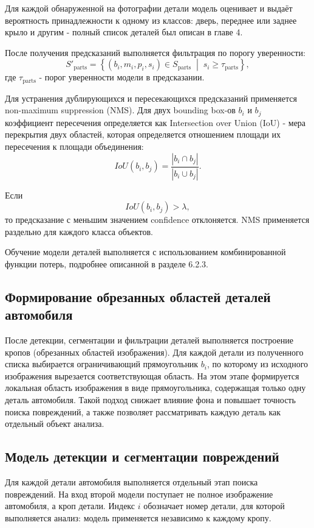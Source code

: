Для каждой обнаруженной на фотографии детали модель оценивает и выдаёт вероятность принадлежности к одному из классов: дверь, переднее или заднее крыло и другим - полный список деталей был описан в главе 4. 


После получения предсказаний выполняется фильтрация по порогу уверенности:
\[
S'_{\text{parts}} =
\left\{
(b_i, m_i, p_i, s_i) \in S_{\text{parts}} \;\middle|\;
s_i \geq \tau_{\text{parts}}
\right\},
\]
где $\tau_{\text{parts}}$ - порог уверенности модели в предсказании.

Для устранения дублирующихся и пересекающихся предсказаний применяется non-maximum suppression (NMS). Для двух bounding box-ов $b_i$ и $b_j$ коэффициент пересечения определяется как Intersection over Union (IoU) - мера перекрытия двух областей, которая определяется отношением площади их пересечения к площади объединения:
\[
IoU(b_i, b_j) = \frac{|b_i \cap b_j|}{|b_i \cup b_j|}.
\]

Если
\[
IoU(b_i, b_j) > \lambda,
\]
то предсказание с меньшим значением confidence отклоняется. NMS применяется раздельно для каждого класса объектов.

Обучение модели деталей выполняется с использованием комбинированной функции потерь, подробнее описанной в разделе 6.2.3.

\subsection{Формирование обрезанных областей деталей автомобиля}

После детекции, сегментации и фильтрации деталей выполняется построение кропов (обрезанных областей изображения). Для каждой детали из полученного списка выбирается ограничивающий прямоугольник $b_i$, по которому из исходного изображения вырезается соответствующая область.
На этом этапе формируется локальная область изображения в виде прямоугольника, содержащая только одну деталь автомобиля. Такой подход снижает влияние фона и повышает точность поиска повреждений, а также позволяет рассматривать каждую деталь как отдельный объект анализа.

\subsection{Модель детекции и сегментации повреждений}

Для каждой детали автомобиля выполняется отдельный этап поиска повреждений. На вход второй модели поступает не полное изображение автомобиля, а кроп детали. Индекс $i$ обозначает номер детали, для которой выполняется анализ: модель применяется независимо к каждому кропу.


